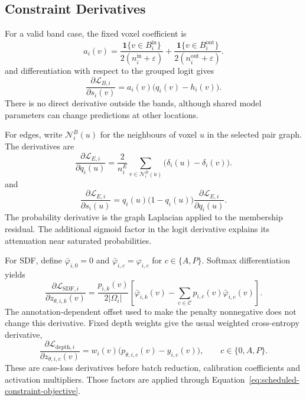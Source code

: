 \subsection{Constraint Derivatives}

For a valid band case, the fixed voxel coefficient is
\begin{equation}
a_i(v)=\frac{\mathbf{1}\{v\in B_i^{\mathrm{in}}\}}
                 {2(n_i^{\mathrm{in}}+\varepsilon)}
       +\frac{\mathbf{1}\{v\in B_i^{\mathrm{out}}\}}
                 {2(n_i^{\mathrm{out}}+\varepsilon)}.
\label{eq:band-voxel-coefficient}
\end{equation}
and differentiation with respect to the grouped logit gives
\begin{equation}
\frac{\partial\mathcal{L}_{B,i}}{\partial s_i(v)}
 =a_i(v)\bigl(q_i(v)-h_i(v)\bigr).
\label{eq:band-logit-gradient}
\end{equation}
There is no direct derivative outside the bands, although shared model
parameters can change predictions at other locations.

For edges, write $\mathcal N_i^B(u)$ for the neighbours of voxel $u$
in the selected pair graph. The derivatives are
\begin{equation}
\frac{\partial\mathcal{L}_{E,i}}{\partial q_i(u)}
=\frac{2}{n_i^E}\sum_{v\in\mathcal{N}_i^B(u)}
       \bigl(\delta_i(u)-\delta_i(v)\bigr).
\label{eq:edge-probability-gradient}
\end{equation}
and
\begin{equation}
\frac{\partial\mathcal{L}_{E,i}}{\partial s_i(u)}
=q_i(u)\bigl(1-q_i(u)\bigr)
  \frac{\partial\mathcal{L}_{E,i}}{\partial q_i(u)}.
\label{eq:edge-logit-gradient}
\end{equation}
The probability derivative is the graph Laplacian applied to the
membership residual. The additional sigmoid factor in the logit
derivative explains its attenuation near saturated probabilities.

For SDF, define $\bar\varphi_{i,0}=0$ and
$\bar\varphi_{i,c}=\varphi_{i,c}$ for $c\in\{A,P\}$. Softmax
differentiation yields
\begin{equation}
\frac{\partial\mathcal{L}_{\mathrm{SDF},i}}
     {\partial z_{\theta,i,k}(v)}
=\frac{p_{i,k}(v)}{2|\Omega_i|}
 \left[\bar\varphi_{i,k}(v)
       -\sum_{c\in\mathcal{C}}p_{i,c}(v)\bar\varphi_{i,c}(v)\right].
\label{eq:sdf-logit-gradient}
\end{equation}
The annotation-dependent offset used to make the penalty nonnegative
does not change this derivative. Fixed depth weights give the usual
weighted cross-entropy derivative,
\begin{equation}
\frac{\partial\mathcal{L}_{\mathrm{depth},i}}
     {\partial z_{\theta,i,c}(v)}
 =w_i(v)\bigl(p_{\theta,i,c}(v)-y_{i,c}(v)\bigr),
\qquad c\in\{0,A,P\}.
\label{eq:depth-logit-gradient}
\end{equation}
These are case-loss derivatives before batch reduction, calibration
coefficients and activation multipliers. Those factors are applied
through Equation~\ref{eq:scheduled-constraint-objective}.

